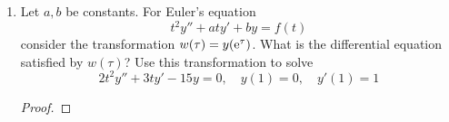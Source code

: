 \documentclass[../psets.tex]{subfiles}
\begin{document}
\begin{enumerate}
\begin{proof}
\begin{equation*}
            \boxed{x^3+4ax^2+2bxy^2+3xy+5y = C}
        \end{equation*}
    \end{proof}
    \item Let $a,b$ be constants. For Euler's equation
    \begin{equation*}
        t^2y''+aty'+by = f(t)
    \end{equation*}
    consider the transformation $w(\tau)=y(\e[\tau])$. What is the differential equation satisfied by $w(\tau)$? Use this transformation to solve
    \begin{equation*}
        2t^2y''+3ty'-15y=0
        ,\quad
        y(1) = 0
        ,\quad
        y'(1) = 1
    \end{equation*}
    \begin{proof}




\end{proof}
\end{enumerate}
\end{document}
